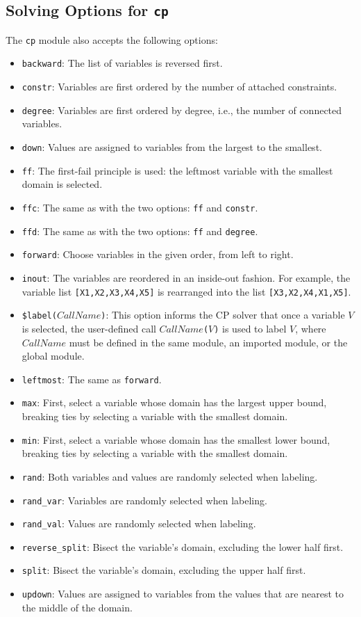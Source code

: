 \subsection{Solving Options for \texttt{cp}}
The \texttt{cp} module also accepts the following options:
\begin{itemize}
\item \texttt{backward}: The list of variables is reversed first.
\item \texttt{constr}: Variables are first ordered by the number of attached constraints.
\item \texttt{degree}: Variables are first ordered by degree, i.e., the number of connected variables.
\item \texttt{down}: Values are assigned to variables from the largest to the smallest.
\item \texttt{ff}: The first-fail principle is used: the leftmost variable with the smallest domain is selected.
\item \texttt{ffc}: The same as with the two options: \texttt{ff} and \texttt{constr}.
\item \texttt{ffd}: The same as with the two options: \texttt{ff} and \texttt{degree}.
\item \texttt{forward}: Choose variables in the given order, from left to right.
\item \texttt{inout}: The variables are reordered in an inside-out fashion. For example, the variable list \texttt{[X1,X2,X3,X4,X5]} is rearranged into the list \texttt{[X3,X2,X4,X1,X5]}.
\item \texttt{\$label($CallName$)}: This option informs the CP solver that once a variable $V$ is selected, the user-defined call \texttt{$CallName$($V$)} is used to label $V$, where $CallName$ must be defined in the same module, an imported module, or the global module.
\item \texttt{leftmost}: The same as \texttt{forward}.
\item \texttt{max}: First, select a variable whose domain has the largest upper bound, breaking ties by selecting a variable with the smallest domain.
\item \texttt{min}: First, select a variable whose domain has the smallest lower bound, breaking ties by selecting a variable with the smallest domain.
\item \texttt{rand}: Both variables and values are randomly selected when labeling.
\item \texttt{rand\_var}: Variables are randomly selected when labeling.
\item \texttt{rand\_val}: Values are randomly selected when labeling.
\item \texttt{reverse\_split}: Bisect the variable's domain, excluding the lower half first.
\item \texttt{split}: Bisect the variable's domain, excluding the upper half first.
\item \texttt{updown}: Values are assigned to variables from the values that are nearest to the middle of the domain.
\end{itemize}

